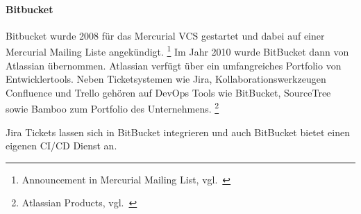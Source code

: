\paragraph{Bitbucket}\label{collaboration_bitbucket}

Bitbucket wurde 2008 für das Mercurial VCS gestartet und dabei auf einer Mercurial Mailing Liste angekündigt. \footnote{Announcement in Mercurial Mailing List, vgl.~\cite{BITBUCKET_HISTORY}}
Im Jahr 2010 wurde BitBucket dann von Atlassian übernommen.
Atlassian verfügt über ein umfangreiches Portfolio von Entwicklertools.
Neben Ticketsystemen wie Jira, Kollaborationswerkzeugen Confluence und Trello gehören auf DevOps Tools wie BitBucket, SourceTree sowie Bamboo zum Portfolio des Unternehmens. \footnote{Atlassian Products, vgl.~\cite{BITBUCKET_OTHER_PRODUCTS}}

Jira Tickets lassen sich in BitBucket integrieren und auch BitBucket bietet einen eigenen CI/CD Dienst an.